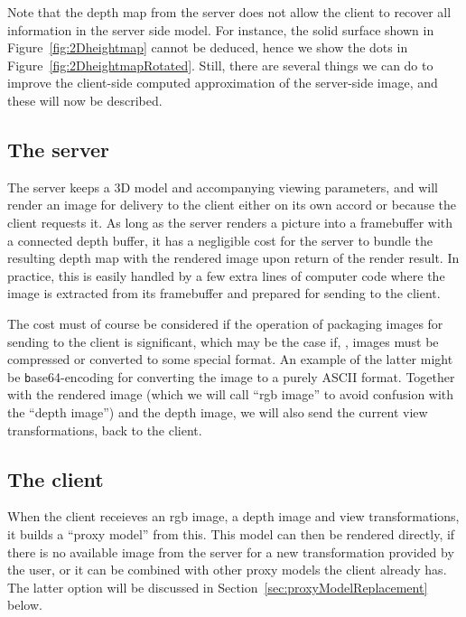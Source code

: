 Note that the depth map from the server does not allow the client to recover all
information in the server side model. For instance, the solid surface shown in
Figure~\ref{fig:2Dheightmap} cannot be deduced, hence we show the dots in
Figure~\ref{fig:2DheightmapRotated}. Still, there are several things we can do
to improve the client-side computed approximation of the server-side image, and
these will now be described.

\subsection{The server}

The server keeps a 3D model and accompanying viewing parameters, and will render
an image for delivery to the client either on its own accord or because the
client requests it. As long as the server renders a picture into a framebuffer
with a connected depth buffer, it has a negligible cost for the server to bundle
the resulting depth map with the rendered image upon return of the render
result. In practice, this is easily handled by a few extra lines of computer
code where the image is extracted from its framebuffer and prepared for sending
to the client.

The cost must of course be considered if the operation of packaging images for
sending to the client is significant, which may be the case if, \eg, images must
be compressed or converted to some special format. An example of the latter
might be {\texttt base64}-encoding for converting the image to a purely ASCII
format. Together with the rendered image (which we will call ``rgb image'' to
avoid confusion with the ``depth image'') and the depth image, we will also send
the current view transformations, back to the client.


\subsection{The client}

When the client receieves an rgb image, a depth image and view transformations,
it builds a ``proxy model'' from this. This model can then be rendered directly,
if there is no available image from the server for a new transformation provided
by the user, or it can be combined with other proxy models the client already
has. The latter option will be discussed in
Section~\ref{sec:proxyModelReplacement} below.


